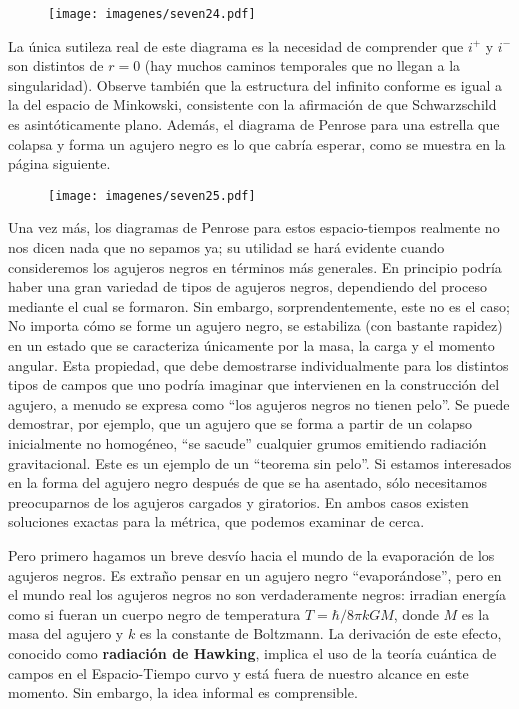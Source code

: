 \documentclass[11pt,b5paper,openany,twoside]{book}
\begin{document}
\begin{figure}[h]
\centering
\texttt{[image: imagenes/seven24.pdf]}
\end{figure}

\noindent
La única sutileza real de este diagrama es la necesidad de comprender que $i^+$ y $i^-$ son distintos de $r=0$ (hay muchos caminos temporales que no llegan a la singularidad).
Observe también que la estructura del infinito conforme es igual a la del espacio de Minkowski, consistente con la afirmación de que Schwarzschild es asintóticamente plano.
Además, el diagrama de Penrose para una estrella que colapsa y forma un agujero negro es lo que cabría esperar, como se muestra en la página siguiente.

\begin{figure}[h]
\centering
\texttt{[image: imagenes/seven25.pdf]}
\end{figure}

Una vez más, los diagramas de Penrose para estos espacio-tiempos realmente no nos dicen nada que no sepamos ya; su utilidad se hará evidente cuando consideremos los agujeros negros en términos más generales.
En principio podría haber una gran variedad de tipos de agujeros negros, dependiendo del proceso mediante el cual se formaron.
Sin embargo, sorprendentemente, este no es el caso; No importa cómo se forme un agujero negro, se estabiliza (con bastante rapidez) en un estado que se caracteriza únicamente por la masa, la carga y el momento angular.
Esta propiedad, que debe demostrarse individualmente para los distintos tipos de campos que uno podría imaginar que intervienen en la construcción del agujero, a menudo se expresa como ``los agujeros negros no tienen pelo''. Se puede demostrar, por ejemplo, que un agujero que se forma a partir de un colapso inicialmente no homogéneo, ``se sacude'' cualquier grumos emitiendo radiación gravitacional.
Este es un ejemplo de un ``teorema sin pelo''. Si estamos interesados en la forma del agujero negro después de que se ha asentado, sólo necesitamos preocuparnos de los agujeros cargados y giratorios.
En ambos casos existen soluciones exactas para la métrica, que podemos examinar de cerca.

Pero primero hagamos un breve desvío hacia el mundo de la evaporación de los agujeros negros.
Es extraño pensar en un agujero negro ``evaporándose'', pero en el mundo real los agujeros negros no son verdaderamente negros: irradian energía como si fueran un cuerpo negro de temperatura $T=\hbar/8\pi kGM$, donde $M$ es la masa del agujero y $k$ es la constante de Boltzmann.
La derivación de este efecto, conocido como {\bf radiación de Hawking}, implica el uso de la teoría cuántica de campos en el Espacio-Tiempo curvo y está fuera de nuestro alcance en este momento.
Sin embargo, la idea informal es comprensible.
\end{document}
